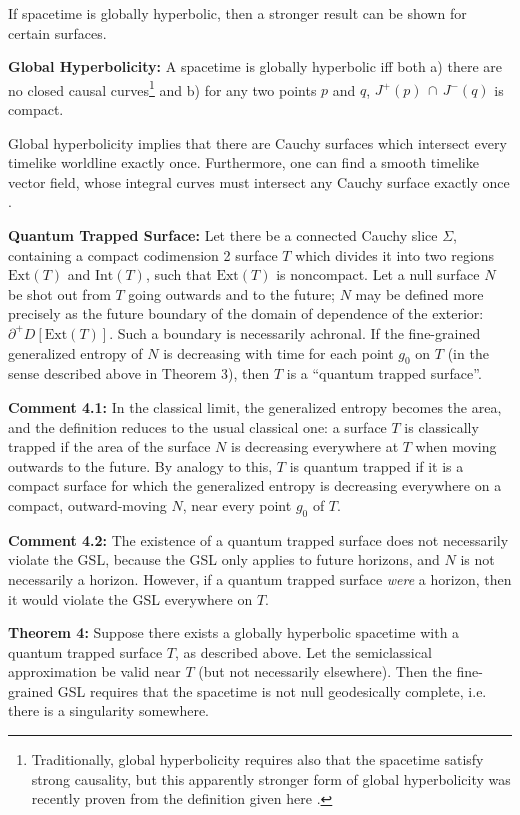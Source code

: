 \documentclass{article}
\begin{document}
If spacetime is globally hyperbolic, then a stronger result can be shown for certain surfaces.

\textbf{Global Hyperbolicity:} A spacetime is globally hyperbolic iff both a) there are no closed causal curves\footnote{Traditionally, global hyperbolicity requires also that the spacetime satisfy strong causality, but this apparently stronger form of global hyperbolicity was recently proven from the definition given here \cite{BernalSanchez}.} and b) for any two points $p$ and $q$, $J^+(p)\,\cap\,J^-(q)$ is compact.

Global hyperbolicity implies that there are Cauchy surfaces which intersect every timelike worldline exactly once.  Furthermore, one can find a smooth timelike vector field, whose integral curves must intersect any Cauchy surface exactly once \cite{HawkingEllis}.

\textbf{Quantum Trapped Surface:} Let there be a connected Cauchy slice $\Sigma$, containing a compact codimension 2 surface $T$ which divides it into two regions $\mathrm{Ext}(T)$ and $\mathrm{Int}(T)$, such that $\mathrm{Ext}(T)$ is noncompact.  Let a null surface $N$ be shot out from $T$ going outwards and to the future; $N$ may be defined more precisely as the future boundary of the domain of dependence of the exterior: $\partial^+ D[\mathrm{Ext}(T)]$.  Such a boundary is necessarily achronal.  If the fine-grained generalized entropy of $N$ is decreasing with time for each point $g_0$ on $T$ (in the sense described above in Theorem 3), then $T$ is a ``quantum trapped surface''.

\textbf{Comment 4.1:} In the classical limit, the generalized entropy becomes the area, and the definition reduces to the usual classical one: a surface $T$ is classically trapped if the area of the surface $N$ is decreasing everywhere at $T$ when moving outwards to the future.   By analogy to this, $T$ is quantum trapped if it is a compact surface for which the generalized entropy is decreasing everywhere on a compact, outward-moving $N$, near every point $g_0$ of $T$.

\textbf{Comment 4.2:} The existence of a quantum trapped surface does not necessarily violate the GSL, because the GSL only applies to future horizons, and $N$ is not necessarily a horizon.  However, if a quantum trapped surface \emph{were} a horizon, then it would violate the GSL everywhere on $T$.

\textbf{Theorem 4:}  Suppose there exists a globally hyperbolic spacetime with a quantum trapped surface $T$, as described above.  Let the semiclassical approximation be valid near $T$ (but not necessarily elsewhere).  Then the fine-grained GSL requires that the spacetime is not null geodesically complete, i.e. there is a singularity somewhere.
\end{document}
